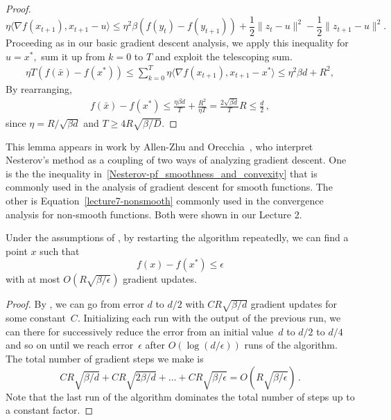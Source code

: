 \begin{proof}
\begin{equation*}
\eta\langle\nabla f(x_{t+1}), x_{t+1} - u\rangle \leq \eta^2 \beta
(f(y_t) - f(y_{t+1})) + \frac12\|z_t - u\|^2 - \frac12\|z_{t+1} - u\|^2.
\end{equation*}
Proceeding as in our basic gradient descent analysis, we apply this inequality
for $u=x^*,$ sum it up from $k=0$ to $T$ and exploit the telescoping sum.
\begin{align*}
\eta T (f(\bar{x}) - f(x^*)) 
\leq \sum_{k=0}^T \eta \langle\nabla f(x_{t+1}), x_{t+1} - x^*\rangle
\leq \eta^2 \beta d + R^2,
\end{align*}
By rearranging,
\begin{align*}
f(\bar{x}) - f(x^*) 
\leq \frac{\eta\beta d}{T} + \frac{R^2}{\eta T}
= \frac{2\sqrt{\beta d}}{T} R 
\leq \frac{d}{2}\,,
\end{align*}
since $\eta=R/\sqrt{\beta d}$ and $T\ge 4R\sqrt{\beta/D}.$
\end{proof}

This lemma appears in work by Allen-Zhu and Orecchia~\cite{allen2014linear}, who
interpret Nesterov's method as a coupling of two ways of analyzing gradient
descent. One is the the inequality
in~\eqref{Nesterov-pf_smoothness_and_convexity} that is commonly used in the
analysis of gradient descent for smooth functions. The other is
Equation~\ref{lecture7-nonsmooth} commonly used in the convergence analysis for
non-smooth functions. Both were shown in our Lecture 2.

\begin{theorem}
Under the assumptions of , by restarting the algorithm
repeatedly, we can find a point $x$ such that
\[
f(x)-f(x^*)\le\epsilon
\]
with at most $O(R\sqrt{\beta/\epsilon})$ gradient updates.
\end{theorem}
\begin{proof}
By , we can go from error $d$ to $d/2$ with
$CR\sqrt{\beta/d}$ gradient updates for some constant~$C$. 
Initializing each run with the output of
the previous run, we can there for successively reduce the error from an initial
value~$d$ to $d/2$ to $d/4$ and so on until we reach error~$\epsilon$ after
$O(\log(d/\epsilon))$ runs of the algorithm. The total number of gradient steps
we make is
\[
CR\sqrt{\beta/d} 
+CR\sqrt{2\beta/d}
+\dots+CR\sqrt{\beta/\epsilon}
= O\left(R\sqrt{\beta/\epsilon}\right)\,.
\]
Note that the last run of the algorithm dominates the total number of steps up to a
constant factor.
\end{proof}

